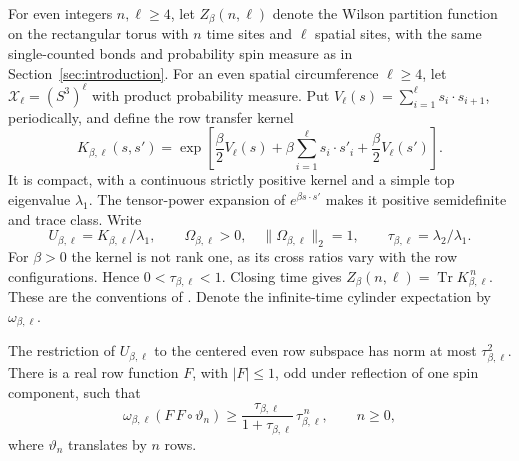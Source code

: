 For even integers $n,\ell\ge4$, let $Z_\beta(n,\ell)$ denote the Wilson partition function on
the rectangular torus with $n$ time sites and $\ell$ spatial
sites, with the same single-counted bonds and probability spin
measure as in Section~\ref{sec:introduction}.
For an even spatial circumference $\ell\ge4$, let
$\mathscr X_\ell=(S^3)^\ell$ with product probability measure.
Put $V_\ell(s)=\sum_{i=1}^{\ell}s_i\cdot s_{i+1}$, periodically,
and define the row transfer kernel
\begin{equation}
 K_{\beta,\ell}(s,s')
 =\exp\left[\frac{\beta}{2}V_\ell(s)
       +\beta\sum_{i=1}^{\ell}s_i\cdot s'_i
       +\frac{\beta}{2}V_\ell(s')\right].
 \label{eq:wilson-row-kernel}
\end{equation}
It is compact, with a continuous strictly positive kernel
and a simple top eigenvalue $\lambda_1$.
The tensor-power expansion of $e^{\beta s\cdot s'}$
makes it positive semidefinite and trace class. Write
\[
 U_{\beta,\ell}=K_{\beta,\ell}/\lambda_1,\qquad
 \Omega_{\beta,\ell}>0,\quad\|\Omega_{\beta,\ell}\|_2=1,\qquad
 \tau_{\beta,\ell}=\lambda_2/\lambda_1.
\]
For $\beta>0$ the kernel is not rank one, as its cross ratios
vary with the row configurations. Hence $0<\tau_{\beta,\ell}<1$.
Closing time gives
$Z_\beta(n,\ell)=\operatorname{Tr}K_{\beta,\ell}^{\,n}$.
These are the conventions of \cite[Section~2.1]{SharpO4}.
Denote the infinite-time cylinder expectation by
$\omega_{\beta,\ell}$.

\begin{lemma}
\label{lem:wilson-detector}
The restriction of $U_{\beta,\ell}$ to the centered even row
subspace has norm at most $\tau_{\beta,\ell}^2$. There is a real
row function $F$, with $|F|\le1$, odd under reflection of one
spin component, such that
\begin{equation}
 \omega_{\beta,\ell}(F\,F\circ\vartheta_n)
 \ge\frac{\tau_{\beta,\ell}}{1+\tau_{\beta,\ell}}\,
                    \tau_{\beta,\ell}^{\,n},\qquad n\ge0,
 \label{eq:wilson-detector-overlap}
\end{equation}
where $\vartheta_n$ translates by $n$ rows.
\end{lemma}

